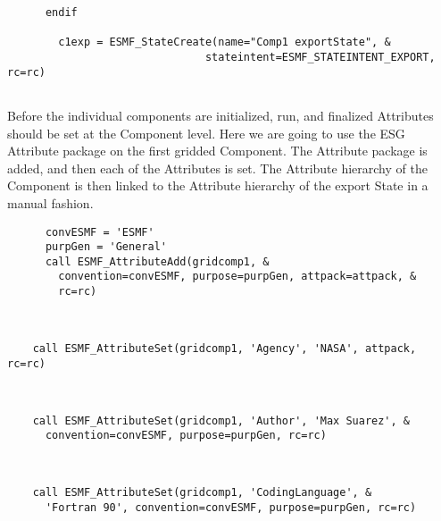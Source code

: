 
 \begin{verbatim}
      endif

        c1exp = ESMF_StateCreate(name="Comp1 exportState", &
                               stateintent=ESMF_STATEINTENT_EXPORT, rc=rc)
 
\end{verbatim}
 
 

   Before the individual components are initialized, run, and finalized Attributes should be set at the
   Component level.  Here we are going to use the ESG Attribute package on
   the first gridded Component.  The Attribute package is added, and then
   each of the Attributes is set.  The Attribute hierarchy of the Component
   is then linked to the Attribute hierarchy of the export State in a
   manual fashion. 

 \begin{verbatim}
      convESMF = 'ESMF'
      purpGen = 'General'
      call ESMF_AttributeAdd(gridcomp1, &
        convention=convESMF, purpose=purpGen, attpack=attpack, &
        rc=rc)
 
\end{verbatim}
 

 \begin{verbatim}

    call ESMF_AttributeSet(gridcomp1, 'Agency', 'NASA', attpack, rc=rc)
 
\end{verbatim}
 

 \begin{verbatim}

    call ESMF_AttributeSet(gridcomp1, 'Author', 'Max Suarez', &
      convention=convESMF, purpose=purpGen, rc=rc)
 
\end{verbatim}
 

 \begin{verbatim}

    call ESMF_AttributeSet(gridcomp1, 'CodingLanguage', &
      'Fortran 90', convention=convESMF, purpose=purpGen, rc=rc)
 
\end{verbatim}
 
